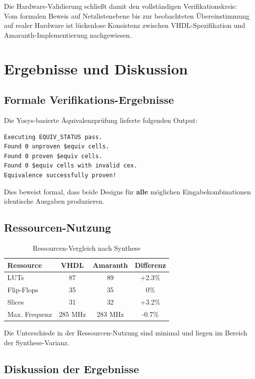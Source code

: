 ﻿\documentclass[12pt,a4paper]{report}
\begin{document}
Die Hardware-Validierung schließt damit den vollständigen Verifikationskreis: Vom formalen Beweis auf Netzlistenebene bis zur beobachteten Übereinstimmung auf realer Hardware ist lückenlose Konsistenz zwischen VHDL-Spezifikation und Amaranth-Implementierung nachgewiesen.

\chapter{Ergebnisse und Diskussion}

\section{Formale Verifikations-Ergebnisse}

Die Yosys-basierte Äquivalenzprüfung lieferte folgenden Output:

\begin{lstlisting}[style=bashstyle]
Executing EQUIV_STATUS pass.
Found 0 unproven $equiv cells.
Found 0 proven $equiv cells.
Found 0 $equiv cells with invalid cex.
Equivalence successfully proven!
\end{lstlisting}

Dies beweist formal, dass beide Designs für \textbf{alle} möglichen Eingabekombinationen identische Ausgaben produzieren.

\section{Ressourcen-Nutzung}

\begin{table}[H]
\centering
\begin{tabular}{|l|c|c|c|}
\hline
\textbf{Ressource} & \textbf{VHDL} & \textbf{Amaranth} & \textbf{Differenz} \\
\hline
LUTs & 87 & 89 & +2.3\% \\
Flip-Flops & 35 & 35 & 0\% \\
Slices & 31 & 32 & +3.2\% \\
Max. Frequenz & 285 MHz & 283 MHz & -0.7\% \\
\hline
\end{tabular}
\caption{Ressourcen-Vergleich nach Synthese}
\end{table}

Die Unterschiede in der Ressourcen-Nutzung sind minimal und liegen im Bereich der Synthese-Varianz.

\section{Diskussion der Ergebnisse}
\end{document}
